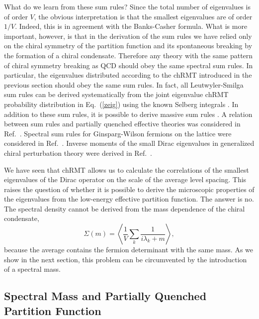 What do we learn from these sum rules? Since the total number of
eigenvalues is of order $V$, the obvious interpretation is that the
smallest eigenvalues are of order $1/V$. Indeed, this is in agreement
with the Banks-Casher formula. What is more important,
however, is that in the derivation of the sum rules we have
relied only on the chiral symmetry of the partition function and its
spontaneous breaking by the formation of a chiral condensate.
Therefore any theory with the same pattern of chiral symmetry breaking
as QCD should obey the same spectral sum rules. In particular, the
eigenvalues distributed according to the chRMT
introduced in the previous section should obey the same sum rules.  In
fact, all Leutwyler-Smilga sum rules can be derived systematically
from the joint eigenvalue chRMT probability distribution in
Eq.~(\ref{zeig}) using the known Selberg integrals \cite{sell}. In
addition to these sum rules, it is possible to derive massive sum rules
\cite{lsmass}.  A relation between sum rules and partially quenched
effective theories was considered in Ref.~\cite{zyab}.  Spectral sum rules
for Ginsparg-Wilson fermions on the lattice were considered in
Ref.~\cite{Farc99c}.  Inverse moments of the small Dirac eigenvalues
in generalized chiral perturbation theory were derived in
Ref.~\cite{Desc99}. 

We have seen that chRMT allows us to
calculate the correlations of the smallest eigenvalues of the Dirac
operator on the scale of the average level spacing. This raises the
question of whether it is possible to derive the microscopic properties
of the eigenvalues from the low-energy effective partition function.
The answer is no.  The spectral density cannot be derived from the
mass dependence of the chiral condensate,
\begin{equation}
  \Sigma(m) =\left \langle\frac 1V \sum_k \frac
    1{i\lambda_k+m}\right\rangle,
\end{equation}
because the average contains the fermion determinant with the same
mass. As we show in the next section, this problem can be
circumvented by the introduction of a spectral mass.


\subsection{Spectral Mass and Partially Quenched Partition Function}
\label{SpectralMass}

